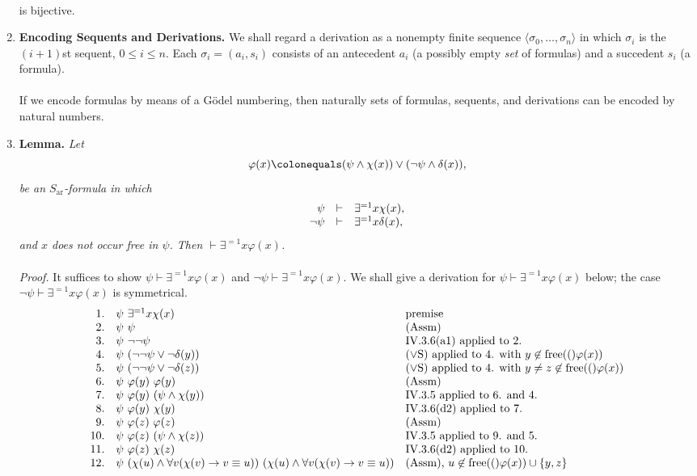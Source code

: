 \documentclass[leqno]{report}
\newcommand{\ar}{\mathrm{ar}}
\newcommand{\free}[1]{\mathop{\mathrm{free}}(#1)}
\newcommand{\assm}{{(\mathrm{Assm})}}
\newcommand{\ors}{{(\lor\mathrm{S})}}
\begin{document}
\begin{enumerate}[1.]
\[\begin{array}{lll}
\end{array}
\]
is bijective.
%
\item \textbf{Encoding Sequents and Derivations.} We shall regard a derivation as a nonempty finite sequence $\langle \sigma_0, \ldots, \sigma_n \rangle$ in which $\sigma_i$ is the $(i + 1)$st sequent, $0 \leq i \leq n$. Each $\sigma_i = (a_i, s_i)$ consists of an antecedent $a_i$ (a possibly empty \emph{set} of formulas) and a succedent $s_i$ (a formula).\\
\ \\
If we encode formulas by means of a G\"{o}del numbering, then naturally sets of formulas, sequents, and derivations can be encoded by natural numbers.
%
\item \textbf{Lemma.} \emph{Let
\[
\varphi(x) \colonequals (\psi \land \chi (x)) \lor (\neg\psi \land \delta (x)),
\]
be an $S_\ar$-formula in which
\[
\begin{array}{rcl}
\psi & \vdash & \exists^{=1} x \chi (x), \cr
\neg\psi & \vdash & \exists^{=1} x \delta (x),
\end{array}
\]
and
$x$ does not occur free in $\psi$. Then $\vdash \exists^{=1} x \varphi(x)$.}\\
\ \\
\textit{Proof.} It suffices to show $\psi \vdash \exists^{=1}x \varphi(x)$ and $\neg\psi \vdash \exists^{=1}x \varphi(x)$. We shall give a derivation for $\psi \vdash \exists^{=1}x \varphi(x)$ below; the case $\neg\psi \vdash \exists^{=1}x \varphi(x)$ is symmetrical.\\
\[
\begin{array}{rll}
1. & \psi \ \exists^{=1}x \chi(x) & \mbox{premise} \cr
2. & \psi \ \psi & \mbox{$\assm$} \cr
3. & \psi \ \neg\neg\psi & \mbox{IV.3.6(a1) applied to 2.} \cr
4. & \psi \ (\neg\neg\psi \lor \neg\delta(y)) & \mbox{$\ors$ applied to 4. with $y \not\in \free(\varphi(x))$} \cr
5. & \psi \ (\neg\neg\psi \lor \neg\delta(z)) & \mbox{$\ors$ applied to 4. with $y \neq z \not\in \free(\varphi(x))$} \cr
6. & \psi \ \varphi(y) \ \varphi(y) & \mbox{$\assm$} \cr
7. & \psi \ \varphi(y) \ (\psi \land \chi(y)) & \mbox{IV.3.5 applied to 6. and 4.} \cr
8. & \psi \ \varphi(y) \ \chi(y) & \mbox{IV.3.6(d2) applied to 7.} \cr
9. & \psi \ \varphi(z) \ \varphi(z) & \mbox{$\assm$} \cr
10. & \psi \ \varphi(z) \ (\psi \land \chi(z)) & \mbox{IV.3.5 applied to 9. and 5.} \cr
11. & \psi \ \varphi(z) \ \chi(z) & \mbox{IV.3.6(d2) applied to 10.} \cr
12. & \psi \ (\chi(u) \land \forall v (\chi(v) \rightarrow v \equiv u)) \ (\chi(u) \land \forall v (\chi(v) \rightarrow v \equiv u)) & \mbox{$\assm$, $u \not\in \free(\varphi(x)) \cup \{ y, z \}$} \cr

\end{array}\]
\end{enumerate}
\end{document}
